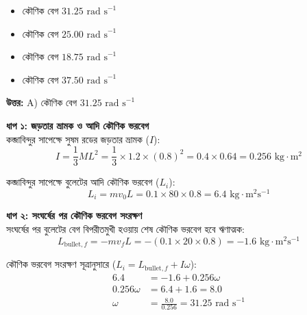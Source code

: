 \documentclass[12pt, a4paper]{article}
\begin{document}
\begin{itemize}[label={}, leftmargin=1cm, itemsep=0.5em]
    \item[\textbf{A)}] কৌণিক বেগ $31.25\text{ rad s}^{-1}$
    \item[\textbf{B)}] কৌণিক বেগ $25.00\text{ rad s}^{-1}$
    \item[\textbf{C)}] কৌণিক বেগ $18.75\text{ rad s}^{-1}$
    \item[\textbf{D)}] কৌণিক বেগ $37.50\text{ rad s}^{-1}$
\end{itemize}

\vspace{0.5em}
\begin{tcolorbox}[answerbox]
    \textbf{\color{success} উত্তর:} A) কৌণিক বেগ $31.25\text{ rad s}^{-1}$
\end{tcolorbox}
\vspace{1em}

\begin{tcolorbox}[solutionbox={সমাধান (Solution)}]
    \noindent
    \textbf{ধাপ ১: জড়তার ভ্রামক ও আদি কৌণিক ভরবেগ} \\
    কব্জাবিন্দুর সাপেক্ষে সুষম রডের জড়তার ভ্রামক ($I$):
    \[ I = \frac{1}{3} M L^2 = \frac{1}{3} \times 1.2 \times (0.8)^2 = 0.4 \times 0.64 = 0.256\text{ kg}\cdot\text{m}^2 \]
    
    কব্জাবিন্দুর সাপেক্ষে বুলেটের আদি কৌণিক ভরবেগ ($L_i$):
    \[ L_i = m v_0 L = 0.1 \times 80 \times 0.8 = 6.4\text{ kg}\cdot\text{m}^2\text{s}^{-1} \]
    
    \vspace{0.5em}
    \noindent\textbf{ধাপ ২: সংঘর্ষের পর কৌণিক ভরবেগ সংরক্ষণ} \\
    সংঘর্ষের পর বুলেটের বেগ বিপরীতমুখী হওয়ায় শেষ কৌণিক ভরবেগ হবে ঋণাত্মক:
    \[ L_{\text{bullet}, f} = -m v_f L = - (0.1 \times 20 \times 0.8) = -1.6\text{ kg}\cdot\text{m}^2\text{s}^{-1} \]
    
    কৌণিক ভরবেগ সংরক্ষণ সূত্রানুসারে ($L_i = L_{\text{bullet}, f} + I \omega$):
    \begin{align*}
        6.4 &= -1.6 + 0.256 \omega \\
        0.256 \omega &= 6.4 + 1.6 = 8.0 \\
        \omega &= \frac{8.0}{0.256} = \mathbf{31.25}\text{ rad s}^{-1}
    \end{align*}
\end{tcolorbox}
\end{document}
